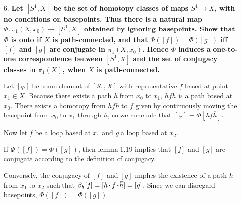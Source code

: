 \documentclass[a4paper,12pt]{article}
\newcommand*\sq{\mathbin{\vcenter{\hbox{\rule{.3ex}{.3ex}}}}}
\begin{document}
\begin{enumerate}
    \item[6.]
        \boldmath\textbf{Let $[S^1, X]$ be the set of homotopy classes of maps $S^1 \to X$, with no conditions on basepoints. Thus there is a natural map $\Phi : \pi_1(X, x_0) \to [S^1, X]$ obtained by ignoring basepoints. Show that $\Phi$ is onto if $X$ is path-connected, and that $\Phi([f]) = \Phi([g])$ iff $[f]$ and $[g]$ are conjugate in $\pi_1(X, x_0)$. Hence $\Phi$ induces a one-to-one correspondence between $[S^1, X]$ and the set of conjugacy classes in $\pi_1(X)$, when $X$ is path-connected.
        }\unboldmath \par
        Let $[\varphi]$ be some element of $[S_1, X]$ with representative $f$ based at point $x_1 \in X$. Because there exists a path $h$ from $x_0$ to $x_1$, $hf\overline{h}$ is a path based at $x_0$. There exists a homotopy from $hf\overline{h}$ to $f$ given by continuously moving the basepoint from $x_0$ to $x_1$ through $h$, so we conclude that $[\varphi] = \Phi[hf\overline{h}]$. \par
        Now let $f$ be a loop based at $x_1$ and $g$ a loop based at $x_2$. \par
        If $\Phi([f]) = \Phi([g])$, then lemma 1.19 implies that $[f]$ and $[g]$ are conjugate according to the definition of conjugacy. \par 
        Conversely, the conjugacy of $[f]$ and $[g]$ implies the existence of a path $h$ from $x_1$ to $x_2$ such that $\beta_h[f] = [h \sq f \sq \overline{h}] = [g]$. Since we can disregard basepoints, $\Phi([f]) = \Phi([g])$.
\end{enumerate}
\end{document}
